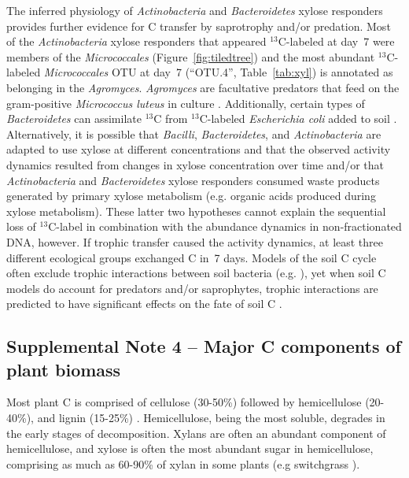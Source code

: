 \documentclass{article}
\begin{document}
The inferred physiology of \textit{Actinobacteria} and \textit{Bacteroidetes}
xylose responders provides further evidence for C transfer by
saprotrophy and/or predation. Most of the \textit{Actinobacteria} xylose
responders that appeared $^{13}$C-labeled at day~7 were members of the
\textit{Micrococcales} (Figure~\ref{fig:tiledtree}) and the most abundant
$^{13}$C-labeled \textit{Micrococcales} OTU at day~7 (“OTU.4”,
Table~\ref{tab:xyl}) is annotated as belonging in the \textit{Agromyces}.
\textit{Agromyces} are facultative predators that feed on the gram-positive
\textit{Micrococcus luteus} in culture \citep{16346402}. Additionally, certain types
of \textit{Bacteroidetes} can assimilate $^{13}$C from $^{13}$C-labeled
\textit{Escherichia coli} added to soil \citep{Lueders2006}.
Alternatively, it is possible that \textit{Bacilli},
\textit{Bacteroidetes}, and \textit{Actinobacteria} are adapted to use
xylose at different concentrations and that the observed activity dynamics
resulted from changes in xylose concentration over time and/or that
\textit{Actinobacteria} and \textit{Bacteroidetes} xylose responders
consumed waste products generated by primary xylose metabolism (e.g.
organic acids produced during xylose metabolism). These latter two
hypotheses cannot explain the sequential loss of $^{13}$C-label in combination
with the abundance dynamics in non-fractionated DNA, however.
If trophic transfer caused the activity dynamics, at least three different
ecological groups exchanged C in~7 days. Models of the soil C cycle often
exclude trophic interactions between soil bacteria (e.g.
\citep{Moore1988}), yet when soil C models do account for predators and/or
saprophytes, trophic interactions are predicted to have significant
effects on the fate of soil C \citep{Kaiser2014a}. 

\subsection{Supplemental Note 4 -- Major C components of plant biomass}
Most plant C is comprised of cellulose (30-50\%) followed by hemicellulose
(20-40\%), and lignin (15-25\%) \citep{Lynd2002}. Hemicellulose, being the most
soluble, degrades in the early stages of decomposition. Xylans are often an
abundant component of hemicellulose, and xylose is often the most abundant
sugar in hemicellulose, comprising as much as 60-90\% of xylan in some plants
(e.g  switchgrass \citep{Bunnell2013}). 
\end{document}
